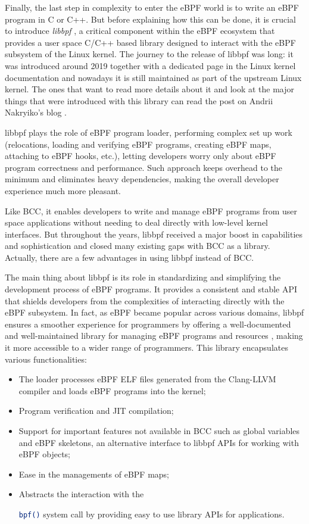 Finally, the last step in complexity to enter the eBPF world is to write an eBPF program in C or C++.
But before explaining how this can be done, it is crucial to introduce \textit{libbpf} \cite{libbpfGitHub}, a critical component within the eBPF ecosystem that provides a user space C/C++ based library designed to interact with the eBPF subsystem of the Linux kernel. 
The journey to the release of libbpf was long: it was introduced around 2019 together with a dedicated page in the Linux kernel documentation \cite{libbpfPageLinuxKernelDOc} and nowadays it is still maintained as part of the upstream Linux kernel.
The ones that want to read more details about it and look at the major things that were introduced with this library can read the post on Andrii Nakryiko's blog \cite{libbpfJourney}.

libbpf plays the role of eBPF program loader, performing complex set up work (relocations, loading and verifying eBPF programs, creating eBPF maps, attaching to eBPF hooks, etc.), letting developers worry only about eBPF program correctness and performance. 
Such approach keeps overhead to the minimum and eliminates heavy dependencies, making the overall developer experience much more pleasant.

Like BCC, it enables developers to write and manage eBPF programs from user space applications without needing to deal directly with low-level kernel interfaces.
But throughout the years, libbpf received a major boost in capabilities and sophistication and closed many existing gaps with BCC as a library.
Actually, there are a few advantages in using libbpf instead of BCC.

The main thing about libbpf is its role in standardizing and simplifying the development process of eBPF programs. 
It provides a consistent and stable API that shields developers from the complexities of interacting directly with the eBPF subsystem. 
In fact, as eBPF became popular across various domains, libbpf ensures a smoother experience for programmers by offering a well-documented and well-maintained library for managing eBPF programs and resources \cite{libbpfDocumentation}, making it more accessible to a wider range of programmers.
This library encapsulates various functionalities:

\begin{itemize}
	\item 
		The loader processes eBPF ELF files generated from the Clang-LLVM compiler and loads eBPF programs into the kernel;
	\item 
		Program verification and JIT compilation;
	\item 
		Support for important features not available in BCC such as global variables and eBPF skeletons, an alternative interface to libbpf APIs for working with eBPF objects;
	\item 
		Ease in the managements of eBPF maps;
	\item 
		Abstracts the interaction with the \raggedright\colorbox{backcolour}{\lstinline[style=commandline, language=bash]|bpf()|} system call by providing easy to use library APIs for applications.
\end{itemize}

